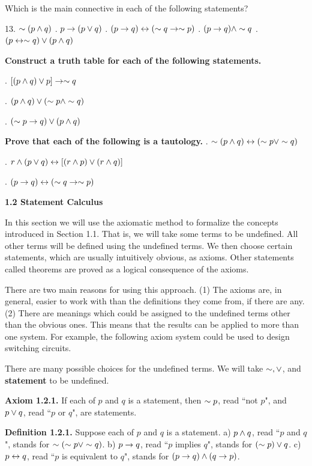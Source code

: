 \begin{large}
Which is the main connective in each of the following statements?  \nl

13. $\sim (p\wedge q)$ . $p \to (p \lor q)$ . $(p \to q) \leftrightarrow  ( \sim q \to \sim p)$ . $(p \to q) \wedge \sim q$ . $(p \leftrightarrow \sim q) \lor (p \wedge q)$ \nl

\newpage
\fl \textbf{Construct a truth table for each of the following statements.} \nl

. $[(p \wedge q) \lor p] \to \sim q$ \nl

. $(p\wedge q) \lor ( \sim p \wedge \sim q)$ \nl

. $(\sim p \to q) \lor (p \wedge q) $ \nl

\fl \textbf{Prove that each of the following is a tautology.} \nl
{}. $\sim (p \wedge q) \leftrightarrow ( \sim p \lor  \sim  q)$ \nl

. $r \wedge (p \lor q) \leftrightarrow [(r \wedge p) \lor (r \wedge q)] $ \nl

. $(p \to q) \leftrightarrow ( \sim q \to \sim p) $ \nl

\fl \textbf{1.2 Statement Calculus} \nl

In this section we will use the axiomatic method to formalize the
concepts introduced in Section 1.1. That is, we will take some terms
to be undefined. All other terms will be defined using the undefined
terms. We then choose certain statements, which are usually intuitively
obvious, as axioms. Other statements called theorems are proved as a
logical consequence of the axioms. \nl

There are two main reasons for using this approach. (1) The axioms
are, in general, easier to work with than the definitions they come from,
if there are any. (2) There are meanings which could be assigned to the
undefined terms other than the obvious ones. This means that the results
can be applied to more than one system. For example, the following
axiom system could be used to design switching circuits. \nl

There are many possible choices for the undefined terms. We will
take $\sim , \lor$, and \textbf{statement} to be undefined. \nl

\fl \textbf{Axiom 1.2.1.} If each of $p$ and $q$ is a statement, then $\sim p$, read
``not $p$", and $p \lor q$, read ``$p$ or $q$", are statements. \nl

\newpage
\fl \textbf{Definition 1.2.1.} Suppose each of $p$ and $q$ is a statement. \nl
a) $p \wedge q$, read ``$p$ and $q$", stands for $\sim (\sim p \lor \sim q)$. \nl
b) $p \to q$, read ``$p$ implies $q$", stands for $(\sim p) \lor q$. \nl
c) $p \leftrightarrow q$, read ``$p$ is equivalent to $q$", stands for $(p \to q) \wedge (q \to p)$. \nl


\end{large}
